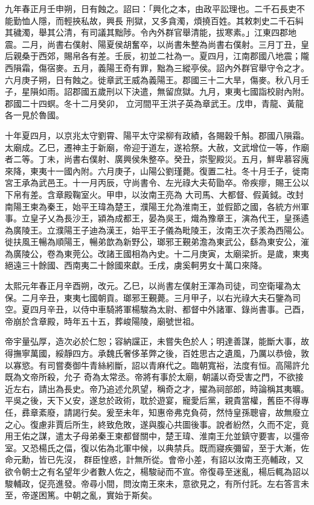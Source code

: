 \begin{pinyinscope}
 九年春正月壬申朔，日有蝕之。詔曰：「興化之本，由政平訟理也。二千石長吏不能勤恤人隱，而輕挾私故，興長
 刑獄，又多貪濁，煩撓百姓。其敕刺史二千石糾其穢濁，舉其公清，有司議其黜陟。令內外群官舉清能，拔寒素。」江東四郡地震。二月，尚書右僕射、陽夏侯胡奮卒，以尚書朱整為尚書右僕射。三月丁丑，皇后親桑于西郊，賜帛各有差。壬辰，初並二社為一。夏四月，江南郡國八地震；隴西隕霜，傷宿麥。五月，義陽王奇有罪，黜為三縱亭侯。詔內外群官舉守令之才。六月庚子朔，日有蝕之。徙章武王威為義陽王。郡國三十二大旱，傷麥。秋八月壬子，星隕如雨。詔郡國五歲刑以下決遣，無留庶獄。九月，東夷七國詣校尉內附。郡國二十四螟。冬十二月癸卯，
 立河間平王洪子英為章武王。戊申，青龍、黃龍各一見於魯國。



 十年夏四月，以京兆太守劉霄、陽平太守梁柳有政績，各賜穀千斛。郡國八隕霜。太廟成。乙巳，遷神主于新廟，帝迎于道左，遂袷祭。大赦，文武增位一等，作廟者二等。丁未，尚書右僕射、廣興侯朱整卒。癸丑，崇聖殿災。五月，鮮卑慕容廆來降，東夷十一國內附。六月庚子，山陽公劉瑾薨。復置二社。冬十月壬子，徙南宮王承為武邑王。十一月丙辰，守尚書令、左光祿大夫荀勖卒。帝疾瘳，賜王公以下帛有差。含章殿鞠室火。甲申，以汝南王亮為
 大司馬、大都督、假黃鉞。改封南陽王柬為秦王，始平王瑋為楚王，濮陽王允為淮南王，並假節之國，各統方州軍事。立皇子乂為長沙王，潁為成都王，晏為吳王，熾為豫章王，演為代王，皇孫遹為廣陵王。立濮陽王子迪為漢王，始平王子儀為毗陵王，汝南王次子羕為西陽公。徙扶風王暢為順陽王，暢弟歆為新野公，瑯邪王覲弟澹為東武公，繇為東安公，漼為廣陵公，卷為東莞公。改諸王國相為內史。十二月庚寅，太廟梁折。是歲，東夷絕遠三十餘國、西南夷二十餘國來獻。壬戌，虜奚軻男女十萬口來降。



 太熙元年春正月辛酉朔，改元。乙巳，以尚書左僕射王渾為司徒，司空衛瓘為太保。二月辛丑，東夷七國朝貢。瑯邪王覲薨。三月甲子，以右光祿大夫石鑒為司空。夏四月辛丑，以侍中車騎將軍楊駿為太尉、都督中外諸軍、錄尚書事。己酉，帝崩於含章殿，時年五十五，葬峻陽陵，廟號世祖。



 帝宇量弘厚，造次必於仁恕；容納讜正，未嘗失色於人；明達善謀，能斷大事，故得撫寧萬國，綏靜四方。承魏氏奢侈革弊之後，百姓思古之遺風，乃厲以恭儉，敦以寡慾。有司嘗奏御牛青絲紖斷，詔以青麻代之。臨朝寬裕，法度有恒。高陽許允既為文帝所殺，允子
 奇為太常丞。帝將有事於太廟，朝議以奇受害之門，不欲接近左右，請出為長史。帝乃追述允夙望，稱奇之才，擢為祠部郎，時論稱其夷曠。平吳之後，天下乂安，遂怠於政術，耽於遊宴，寵愛后黨，親貴當權，舊臣不得專任，彞章紊廢，請謁行矣。爰至未年，知惠帝弗克負荷，然恃皇孫聰睿，故無廢立之心。復慮非賈后所生，終致危敗，遂與腹心共圖後事。說者紛然，久而不定，竟用王佑之謀，遣太子母弟秦王柬都督關中，楚王瑋、淮南王允並鎮守要害，以彊帝室。又恐楊氏之偪，復以佑為北軍中候，以典禁兵。既而寢疾彌留，至于大漸，佐命元勳，皆已先沒，
 群臣惶惑，計無所從。會帝小差，有詔以汝南王亮輔政，又欲令朝士之有名望年少者數人佐之，楊駿祕而不宣。帝復尋至迷亂，楊后輒為詔以駿輔政，促亮進發。帝尋小間，問汝南王來未，意欲見之，有所付託。左右答言未至，帝遂困篤。中朝之亂，實始于斯矣。




\end{pinyinscope}
